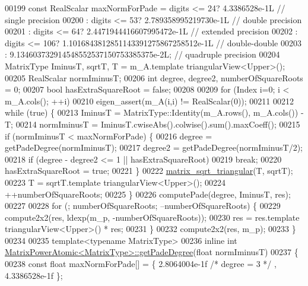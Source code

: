 \begin{DoxyCode}
00199   \textcolor{keyword}{const} RealScalar maxNormForPade = digits <=  24? 4.3386528e-1L                            \textcolor{comment}{// single
       precision}
00200                                   : digits <=  53? 2.789358995219730e-1L                    \textcolor{comment}{// double
       precision}
00201                                   : digits <=  64? 2.4471944416607995472e-1L                \textcolor{comment}{// extended
       precision}
00202                                   : digits <= 106? 1.1016843812851143391275867258512e-1L    \textcolor{comment}{//
       double-double}
00203                                   :                9.134603732914548552537150753385375e-2L; \textcolor{comment}{// quadruple
       precision}
00204   MatrixType IminusT, sqrtT, T = m\_A.template triangularView<Upper>();
00205   RealScalar normIminusT;
00206   \textcolor{keywordtype}{int} degree, degree2, numberOfSquareRoots = 0;
00207   \textcolor{keywordtype}{bool} hasExtraSquareRoot = \textcolor{keyword}{false};
00208 
00209   \textcolor{keywordflow}{for} (Index i=0; i < m\_A.cols(); ++i)
00210     eigen\_assert(m\_A(i,i) != RealScalar(0));
00211 
00212   \textcolor{keywordflow}{while} (\textcolor{keyword}{true}) \{
00213     IminusT = MatrixType::Identity(m\_A.rows(), m\_A.cols()) - T;
00214     normIminusT = IminusT.cwiseAbs().colwise().sum().maxCoeff();
00215     \textcolor{keywordflow}{if} (normIminusT < maxNormForPade) \{
00216       degree = getPadeDegree(normIminusT);
00217       degree2 = getPadeDegree(normIminusT/2);
00218       \textcolor{keywordflow}{if} (degree - degree2 <= 1 || hasExtraSquareRoot)
00219     \textcolor{keywordflow}{break};
00220       hasExtraSquareRoot = \textcolor{keyword}{true};
00221     \}
00222     \hyperlink{namespace_eigen_ae51c91f920f6ea4a7f6f72caa1e8249f}{matrix\_sqrt\_triangular}(T, sqrtT);
00223     T = sqrtT.template triangularView<Upper>();
00224     ++numberOfSquareRoots;
00225   \}
00226   computePade(degree, IminusT, res);
00227 
00228   \textcolor{keywordflow}{for} (; numberOfSquareRoots; --numberOfSquareRoots) \{
00229     compute2x2(res, ldexp(m\_p, -numberOfSquareRoots));
00230     res = res.template triangularView<Upper>() * res;
00231   \}
00232   compute2x2(res, m\_p);
00233 \}
00234   
00235 \textcolor{keyword}{template}<\textcolor{keyword}{typename} MatrixType>
00236 \textcolor{keyword}{inline} \textcolor{keywordtype}{int} \hyperlink{class_eigen_1_1_matrix_power_atomic}{MatrixPowerAtomic<MatrixType>::getPadeDegree}(\textcolor{keywordtype}{float} 
      normIminusT)
00237 \{
00238   \textcolor{keyword}{const} \textcolor{keywordtype}{float} maxNormForPade[] = \{ 2.8064004e-1f \textcolor{comment}{/* degree = 3 */} , 4.3386528e-1f \};

\end{DoxyCode}
